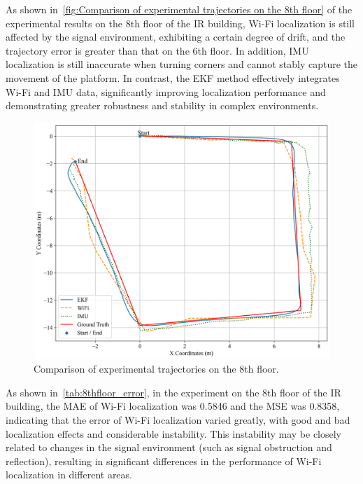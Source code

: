 \documentclass[12pt,a4paper]{article}
\numberwithin{equation}{section}
\begin{document}
As shown in~\autoref{fig:Comparison of experimental trajectories on the 8th
  floor} of the experimental results on the 8th floor of the IR building, Wi-Fi
localization is still affected by the signal environment, exhibiting a certain
degree of drift, and the trajectory error is greater than that on the 6th
floor. In addition, IMU localization is still inaccurate when turning corners
and cannot stably capture the movement of the platform. In contrast, the EKF
method effectively integrates Wi-Fi and IMU data, significantly improving
localization performance and demonstrating greater robustness and stability in
complex environments.
\begin{figure}[H]
  \centering
  \includegraphics[width=0.7\linewidth]{images/1/1.png}
  \caption{Comparison of experimental trajectories on the 8th floor.}
  \label{fig:Comparison of experimental trajectories on the 8th floor}
\end{figure}

As shown in~\autoref{tab:8thfloor_error}, in the experiment on the 8th floor of
the IR building, the MAE of Wi-Fi localization was 0.5846 and the MSE was
0.8358, indicating that the error of Wi-Fi localization varied greatly, with
good and bad localization effects and considerable instability. This instability
may be closely related to changes in the signal environment (such as signal
obstruction and reflection), resulting in significant differences in the
performance of Wi-Fi localization in different areas.
\end{document}
